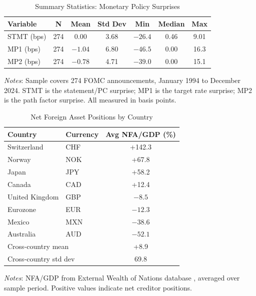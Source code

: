 \documentclass[12pt]{article}
\begin{document}
\begin{table}
\centering
\caption{Summary Statistics: Monetary Policy Surprises}
\label{tab:surprise_summary}
\begin{tabular}{lcccccc}
\toprule
Variable & N & Mean & Std Dev & Min & Median & Max \\
\midrule
STMT (bps) & 274 & 0.00 & 3.68 & $-26.4$ & 0.46 & 9.01 \\
MP1 (bps) & 274 & $-1.04$ & 6.80 & $-46.5$ & 0.00 & 16.3 \\
MP2 (bps) & 274 & $-0.78$ & 4.71 & $-39.0$ & 0.00 & 15.1 \\
\bottomrule
\end{tabular}
\begin{flushleft}
\footnotesize \textit{Notes}: Sample covers 274 FOMC announcements, January 1994 to December 2024. STMT is the statement/PC surprise; MP1 is the target rate surprise; MP2 is the path factor surprise. All measured in basis points.
\end{flushleft}
\end{table}

\begin{table}
\centering
\caption{Net Foreign Asset Positions by Country}
\label{tab:nfa_summary}
\begin{tabular}{llc}
\toprule
Country & Currency & Avg NFA/GDP (\%) \\
\midrule
Switzerland & CHF & +142.3 \\
Norway & NOK & +67.8 \\
Japan & JPY & +58.2 \\
Canada & CAD & +12.4 \\
United Kingdom & GBP & $-8.5$ \\
Eurozone & EUR & $-12.3$ \\
Mexico & MXN & $-38.6$ \\
Australia & AUD & $-52.1$ \\
\midrule
\multicolumn{2}{l}{Cross-country mean} & +8.9 \\
\multicolumn{2}{l}{Cross-country std dev} & 69.8 \\
\bottomrule
\end{tabular}
\begin{flushleft}
\footnotesize \textit{Notes}: NFA/GDP from External Wealth of Nations database \citep{lane2018external}, averaged over sample period. Positive values indicate net creditor positions.
\end{flushleft}
\end{table}
\end{document}
